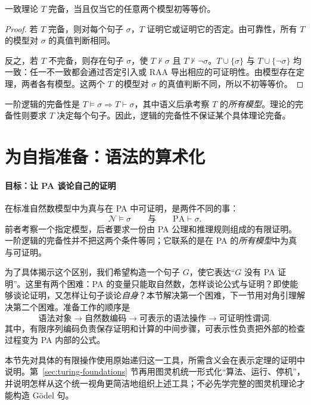 \documentclass[lang=cn,a4paper,fontset=none,zihao=false,10pt,openany,twoside]{beautybook}
\numberwithin{algorithm}{chapter}
\begin{document}
\begin{proposition}
一致理论 $T$ 完备，当且仅当它的任意两个模型初等等价。
\end{proposition}
\begin{proof}
若 $T$ 完备，则对每个句子 $\sigma$，$T$ 证明它或证明它的否定。由可靠性，所有 $T$ 的模型对 $\sigma$ 的真值判断相同。

反之，若 $T$ 不完备，则存在句子 $\sigma$，使 $T\nvdash\sigma$ 且 $T\nvdash\neg\sigma$。$T\cup\{\sigma\}$ 与 $T\cup\{\neg\sigma\}$ 均一致：任一不一致都会通过否定引入或 RAA 导出相应的可证明性。由模型存在定理，两者各有模型。这两个 $T$ 的模型对 $\sigma$ 的真值判断不同，所以不初等等价。
\end{proof}

\begin{remark}[两种完备性]
一阶逻辑的完备性是 $T\models\sigma\Rightarrow T\vdash\sigma$，其中语义后承考察 $T$ 的\emph{所有模型}。理论的完备性则要求 $T$ 决定每个句子。因此，逻辑的完备性不保证某个具体理论完备。
\end{remark}

\section{为自指准备：语法的算术化}\label{sec:syntax-arithmetic}
\paragraph{目标：让 PA 谈论自己的证明}
在标准自然数模型中为真与在 PA 中可证明，是两件不同的事：
\[
 \mathcal N\models\sigma
 \qquad\text{与}\qquad
 \mathrm{PA}\vdash\sigma.
\]
前者考察一个指定模型，后者要求一份由 PA 公理和推理规则组成的有限证明。一阶逻辑的完备性并不把这两个条件等同；它联系的是在 PA 的\emph{所有模型}中为真与可证明。

为了具体揭示这个区别，我们希望构造一个句子 $G$，使它表达“$G$ 没有 PA 证明”。这里有两个困难：PA 的变量只能取自然数，怎样谈论公式与证明？即使能够谈论证明，又怎样让句子谈论\emph{自身}？本节解决第一个困难，下一节用对角引理解决第二个困难。准备工作的顺序是
\[
 \text{语法对象}\longrightarrow\text{自然数编码}
 \longrightarrow\text{可表示的语法操作}
 \longrightarrow\text{可证明性谓词}.
\]
其中，有限序列编码负责保存证明和计算的中间步骤，可表示性负责把外部的检查过程变为 PA 内部的公式。

本节先对具体的有限操作使用原始递归这一工具，所需含义会在表示定理的证明中说明。第~\ref{sec:turing-foundations} 节再用图灵机统一形式化“算法、运行、停机”，并说明怎样从这个统一视角更简洁地组织上述工具；不必先学完整的图灵机理论才能构造 Gödel 句。
\end{document}
